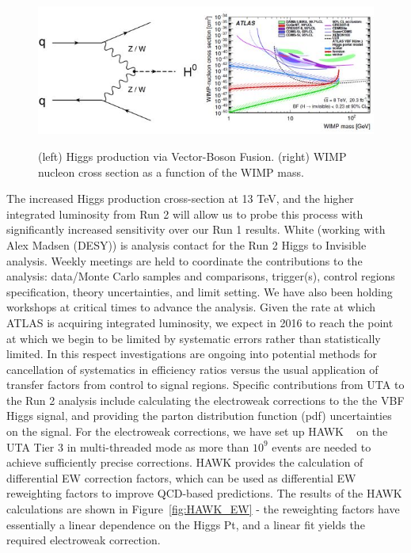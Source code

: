 \begin{figure}[htb]
\centering

      \includegraphics[scale=0.8]{images/Higgs_VBF_diagram.JPG}
      \label{fig:Higgs_VBF_diagram}

\caption{(left) Higgs production via Vector-Boson Fusion. (right) WIMP nucleon cross section as a function of the WIMP mass.}
\end{figure}


The increased Higgs production cross-section at 13 TeV, and the higher integrated luminosity from Run 2 will allow us to probe this process
with significantly increased sensitivity over our Run 1 results. White (working with Alex Madsen (DESY)) is analysis contact for the
Run 2 Higgs to Invisible analysis. Weekly meetings are held to coordinate the contributions to the analysis: data/Monte Carlo samples and 
comparisons, trigger(s), control regions specification, theory uncertainties, and limit setting. We have also been holding workshops 
at critical times to advance the analysis. 
Given the rate at which ATLAS is acquiring integrated luminosity, we expect in 2016 to reach the point at which we begin to be limited by 
systematic errors rather than statistically limited. In this respect investigations are ongoing into potential methods
for cancellation of systematics in efficiency ratios versus the usual application of transfer factors from control to signal regions.
Specific contributions from UTA to the Run 2 analysis include calculating the electroweak corrections to the the VBF Higgs signal, and
providing the parton distribution function (pdf) uncertainties on the signal. For the electroweak corrections, we have set up HAWK ~\cite{HAWK} 
on the UTA Tier 3 in multi-threaded 
mode as more than $10^{9}$ events are needed to achieve sufficiently precise corrections. HAWK provides the calculation of differential 
EW correction factors, which can be used as differential EW reweighting factors to improve QCD-based predictions. The results of the HAWK
calculations are shown in Figure~\ref{fig:HAWK_EW} - the reweighting factors have essentially a linear dependence on the Higgs Pt, and a linear fit
yields the required electroweak correction. 

